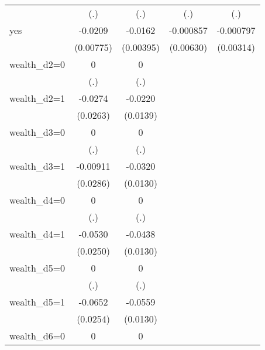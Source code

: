 \begin{table}[htbp]
\begin{tabular}{l*{4}{c}}
                &      (.)         &      (.)         &      (.)         &      (.)         \\
yes             &  -0.0209\sym{***}&  -0.0162\sym{***}&-0.000857         &-0.000797         \\
                &(0.00775)         &(0.00395)         &(0.00630)         &(0.00314)         \\
wealth\_d2=0     &        0         &        0         &                  &                  \\
                &      (.)         &      (.)         &                  &                  \\
wealth\_d2=1     &  -0.0274         &  -0.0220         &                  &                  \\
                & (0.0263)         & (0.0139)         &                  &                  \\
wealth\_d3=0     &        0         &        0         &                  &                  \\
                &      (.)         &      (.)         &                  &                  \\
wealth\_d3=1     & -0.00911         &  -0.0320\sym{**} &                  &                  \\
                & (0.0286)         & (0.0130)         &                  &                  \\
wealth\_d4=0     &        0         &        0         &                  &                  \\
                &      (.)         &      (.)         &                  &                  \\
wealth\_d4=1     &  -0.0530\sym{**} &  -0.0438\sym{***}&                  &                  \\
                & (0.0250)         & (0.0130)         &                  &                  \\
wealth\_d5=0     &        0         &        0         &                  &                  \\
                &      (.)         &      (.)         &                  &                  \\
wealth\_d5=1     &  -0.0652\sym{**} &  -0.0559\sym{***}&                  &                  \\
                & (0.0254)         & (0.0130)         &                  &                  \\
wealth\_d6=0     &        0         &        0         &                  &                  \\

\end{tabular}
\end{table}
